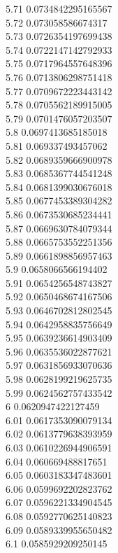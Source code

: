 {5.71	0.0734842295165567\\
5.72	0.073058586674317\\
5.73	0.0726354197699438\\
5.74	0.0722147142792933\\
5.75	0.0717964557648396\\
5.76	0.0713806298751418\\
5.77	0.0709672223443142\\
5.78	0.0705562189915005\\
5.79	0.0701476057203507\\
5.8	0.0697413685185018\\
5.81	0.069337493457062\\
5.82	0.0689359666900978\\
5.83	0.0685367744541248\\
5.84	0.0681399030676018\\
5.85	0.0677453389304282\\
5.86	0.0673530685234441\\
5.87	0.0669630784079344\\
5.88	0.0665753552251356\\
5.89	0.0661898856957463\\
5.9	0.0658066566194402\\
5.91	0.0654256548743827\\
5.92	0.0650468674167506\\
5.93	0.0646702812802545\\
5.94	0.0642958835756649\\
5.95	0.0639236614903409\\
5.96	0.0635536022877621\\
5.97	0.0631856933070636\\
5.98	0.0628199219625735\\
5.99	0.0624562757433542\\
6	0.0620947422127459\\
6.01	0.0617353090079134\\
6.02	0.0613779638393959\\
6.03	0.0610226944906591\\
6.04	0.060669488817651\\
6.05	0.0603183347483601\\
6.06	0.0599692202823762\\
6.07	0.0596221334904545\\
6.08	0.0592770625140823\\
6.09	0.0589339955650482\\
6.1	0.0585929209250145\\
}
